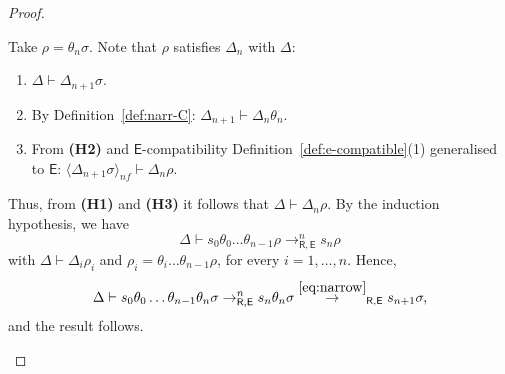 \documentclass[11pt,a4paper]{amsart}
\newcommand{\theory}[1]{\ensuremath{\mathsf{#1}}}
\theoremstyle{plain}
\theoremstyle{definition}
\theoremstyle{remark}
\begin{document}
\begin{proof}
\begin{itemize}
    
    
    Take $\rho = \theta_n\sigma$. Note that  $\rho$ satisfies $\Delta_n$ with $\Delta$:
    \begin{enumerate}[\bf (H1)]
        \item $\Delta\vdash \Delta_{n+1}\sigma$.
        \item By Definition~\ref{def:narr-C}: $\Delta_{n+1}\vdash \Delta_n\theta_n$.
        \item From {\bf (H2)} and \theory{E}-compatibility Definition~\ref{def:e-compatible}(1) generalised to \theory{E}:  $\langle\Delta_{n+1}\sigma\rangle_{nf} \vdash \Delta_n\rho$.
    \end{enumerate}
     Thus, from {\bf (H1)} and {\bf (H3)} it follows that  $\Delta\vdash \Delta_n\rho$.
    By the induction hypothesis,  we have 
    $$\Delta \vdash s_0\theta_0\ldots\theta_{n-1}\rho \rightarrow^{n}_{\theory{R,E}} s_n\rho$$
    with $\Delta\vdash \Delta_i\rho_i$ 
    and $\rho_i = \theta_i\ldots\theta_{n-1}\rho$, for every $i=1,\ldots, n$. Hence,
    $$\Delta \vdash s_0\theta_0\ldots\theta_{n-1}\theta_n\sigma \to^{n}_{\theory{R,E}} s_n\theta_n\sigma \overset{\eqref{eq:narrow}}{\to}_{\theory{R,E}} s_{n+1}\sigma,$$
    and the result follows.
%
\end{itemize}
%
\end{proof}



\end{document}
